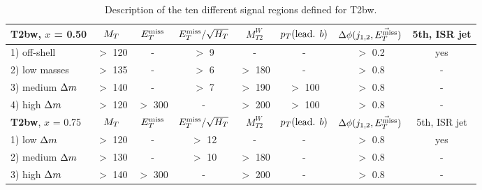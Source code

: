\begin{table}[!ht]
{\begin{center}
\begin{tabular}{|l|ccccccc|}
        \hline
          \textbf{T2bw}, $x$ = 0.50       & $M_T$     & $E_T^\text{miss}$    & $E_T^\text{miss}/\sqrt{H_T}$ & $M_{T2}^W$ & $p_T(\text{lead. }b)$ & $\Delta\phi(j_{1,2},\vec{E_T^\text{miss}})$ & 5th, ISR jet  \\
            \hline
        1) off-shell       &  $>$ 120  &   -      &  $>$  9         &    -       & -                     &  $>$ 0.2      & yes           \\
        2) low masses      &  $>$ 135  &   -      &  $>$  6         & $>$ 180    & -                     &  $>$ 0.8      & -             \\
        3) medium $\Delta m$ &  $>$ 140  &   -      &  $>$  7         & $>$ 190    & $>$ 100               &  $>$ 0.8      & -             \\
        4) high   $\Delta m$ &  $>$ 120  & $>$ 300  &   -             & $>$ 200    & $>$ 100               &  $>$ 0.8      & -             \\
            \hline
            \textbf{T2bw}, $x$ = 0.75     & $M_T$     & $E_T^\text{miss}$    & $E_T^\text{miss}/\sqrt{H_T}$ & $M_{T2}^W$ & $p_T(\text{lead. }b)$ & $\Delta\phi(j_{1,2},\vec{E_T^\text{miss}})$ & 5th, ISR jet  \\
            \hline
        1) low    $\Delta m$ &  $>$ 120  &   -      &  $>$  12        &     -      &      -                &  $>$ 0.8      & yes           \\
        2) medium $\Delta m$ &  $>$ 130  &   -      &  $>$  10        &  $>$ 180   &      -                &  $>$ 0.8      & -             \\
        3) high   $\Delta m$ &  $>$ 140  & $>$ 300  &    -            &  $>$ 200   &      -                &  $>$ 0.8      & -             \\
            \hline                                                 
        \end{tabular}
\caption{Description of the ten different signal regions defined for T2bw. \label{tab:cutAndCountCuts}} 
\end{center}}
\end{table}


